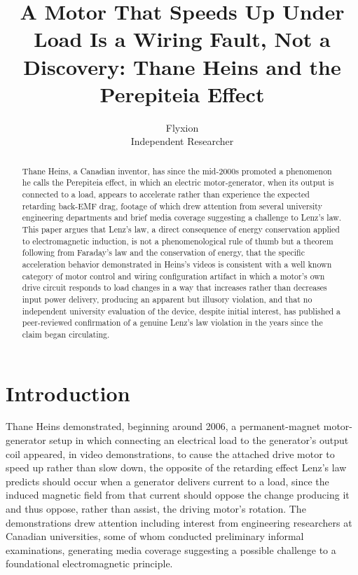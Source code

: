 \documentclass[11pt]{article}
\title{A Motor That Speeds Up Under Load Is a Wiring Fault, Not a Discovery: Thane Heins and the Perepiteia Effect}
\author{Flyxion \\ \small Independent Researcher}
\date{}
\begin{document}
\maketitle

\begin{abstract}
Thane Heins, a Canadian inventor, has since the mid-2000s promoted a phenomenon he calls the Perepiteia effect, in which an electric motor-generator, when its output is connected to a load, appears to accelerate rather than experience the expected retarding back-EMF drag, footage of which drew attention from several university engineering departments and brief media coverage suggesting a challenge to Lenz's law. This paper argues that Lenz's law, a direct consequence of energy conservation applied to electromagnetic induction, is not a phenomenological rule of thumb but a theorem following from Faraday's law and the conservation of energy, that the specific acceleration behavior demonstrated in Heins's videos is consistent with a well known category of motor control and wiring configuration artifact in which a motor's own drive circuit responds to load changes in a way that increases rather than decreases input power delivery, producing an apparent but illusory violation, and that no independent university evaluation of the device, despite initial interest, has published a peer-reviewed confirmation of a genuine Lenz's law violation in the years since the claim began circulating.
\end{abstract}

\section{Introduction}

Thane Heins demonstrated, beginning around 2006, a permanent-magnet motor-generator setup in which connecting an electrical load to the generator's output coil appeared, in video demonstrations, to cause the attached drive motor to speed up rather than slow down, the opposite of the retarding effect Lenz's law predicts should occur when a generator delivers current to a load, since the induced magnetic field from that current should oppose the change producing it and thus oppose, rather than assist, the driving motor's rotation. The demonstrations drew attention including interest from engineering researchers at Canadian universities, some of whom conducted preliminary informal examinations, generating media coverage suggesting a possible challenge to a foundational electromagnetic principle.
\end{document}
